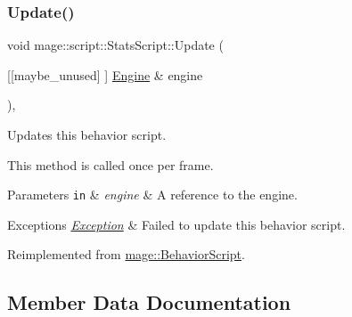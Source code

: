 \hypertarget{classmage_1_1script_1_1_stats_script_aad8c3b8fb846d47605b1f1d14f1ea157}{}\label{classmage_1_1script_1_1_stats_script_aad8c3b8fb846d47605b1f1d14f1ea157} 
\subsubsection{\texorpdfstring{Update()}{Update()}}
{\footnotesize\ttfamily void mage\+::script\+::\+Stats\+Script\+::\+Update (\begin{DoxyParamCaption}\item[{\mbox{[}\mbox{[}maybe\+\_\+unused\mbox{]} \mbox{]} \hyperlink{classmage_1_1_engine}{Engine} \&}]{engine }\end{DoxyParamCaption})\hspace{0.3cm}{\ttfamily [override]}, {\ttfamily [virtual]}}

Updates this behavior script.

This method is called once per frame.


\begin{DoxyParams}[1]{Parameters}
\mbox{\tt in}  & {\em engine} & A reference to the engine. \\
\hline
\end{DoxyParams}

\begin{DoxyExceptions}{Exceptions}
{\em \hyperlink{classmage_1_1_exception}{Exception}} & Failed to update this behavior script. \\
\hline
\end{DoxyExceptions}


Reimplemented from \hyperlink{classmage_1_1_behavior_script_a085634661326b59850c1111e537baa4e}{mage\+::\+Behavior\+Script}.



\subsection{Member Data Documentation}
\hypertarget{classmage_1_1script_1_1_stats_script_a7ef910aceb585af53110697ea5b3f810}{}\label{classmage_1_1script_1_1_stats_script_a7ef910aceb585af53110697ea5b3f810} 
